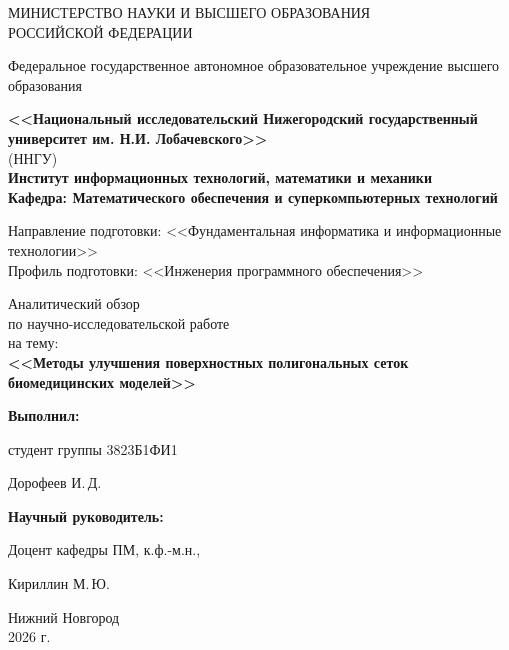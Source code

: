 \begin{titlepage}
	\begin{center}
		\large
		{МИНИСТЕРСТВО НАУКИ И ВЫСШЕГО ОБРАЗОВАНИЯ\\ РОССИЙСКОЙ ФЕДЕРАЦИИ}

		Федеральное государственное автономное образовательное учреждение высшего образования
		\vspace{0.5cm}

		\textbf{<<Национальный исследовательский Нижегородский государственный университет им. Н.И. Лобачевского>>}\\
		(ННГУ)\\
		\vspace{1cm}
		\textbf{Институт информационных технологий, математики и механики}\\
		\vspace{0.5cm}
		\textbf{Кафедра: Ма­те­ма­ти­че­ско­го обес­пе­че­ния и су­пер­ком­пью­тер­ных тех­но­ло­гий}
		\vspace{1cm}

		Направление подготовки: <<Фундаментальная информатика и информационные технологии>>\\
		Профиль подготовки: <<Инженерия программного обеспечения>>
		\vfill

		\vfill

		\Large
		Аналитический обзор \\
		\normalsize
        по научно-исследовательской работе \\
		на тему:\\
		\Large
		\textbf{<<Методы улучшения поверхностных полигональных сеток биомедицинских моделей>>}
		{\LARGE
		}
		\bigskip


	\end{center}
	\vfill

	\hfill\begin{minipage}{0.4\textwidth}
		\textbf{Выполнил:}

            студент группы 3823Б1ФИ1

            \underline{\hspace{3cm}} Дорофеев И.\,Д. \bigskip

	\end{minipage}%

	\hfill\begin{minipage}{0.4\textwidth}
		\textbf{Научный руководитель:}

		Доцент кафедры ПМ, к.ф.-м.н.,

		\underline{\hspace{3cm}}  Кириллин М.\,Ю.

	\end{minipage}
	\vfill

	\begin{center}
		Нижний Новгород\\
		2026 г.
	\end{center}
\end{titlepage}
\thispagestyle{empty} %
